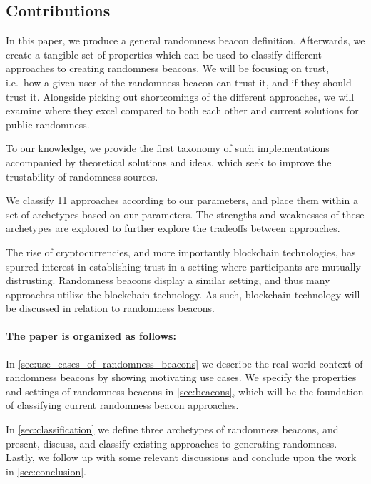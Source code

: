 \subsection*{Contributions}\label{subsec:contributions}
In this paper, we produce a general randomness beacon definition. Afterwards, we create a tangible set of properties which can be used to classify different approaches to creating randomness beacons.
We will be focusing on trust, i.e.\ how a given user of the randomness beacon can trust it, and if they should trust it.
Alongside picking out shortcomings of the different approaches, we will examine where they excel compared to both each other and current solutions for public randomness.

To our knowledge, we provide the first taxonomy of such implementations accompanied by theoretical solutions and ideas, which seek to improve the trustability of randomness sources.

We classify 11 approaches according to our parameters, and place them within a set of archetypes based on our parameters. The strengths and weaknesses of these archetypes are explored to further explore the tradeoffs between approaches. 

The rise of cryptocurrencies, and more importantly blockchain technologies, has spurred interest in establishing trust in a setting where participants are mutually distrusting.
Randomness beacons display a similar setting, and thus many approaches utilize the blockchain technology.
As such, blockchain technology will be discussed in relation to randomness beacons.

\paragraph{The paper is organized as follows:}
In \cref{sec:use_cases_of_randomness_beacons} we describe the real-world context of randomness beacons by showing motivating use cases.
We specify the properties and settings of randomness beacons in \cref{sec:beacons}, which will be the foundation of classifying current randomness beacon approaches.

In \cref{sec:classification} we define three archetypes of randomness beacons, and present, discuss, and classify existing approaches to generating randomness.
Lastly, we follow up with some relevant discussions and  conclude upon the work in \cref{sec:conclusion}.

